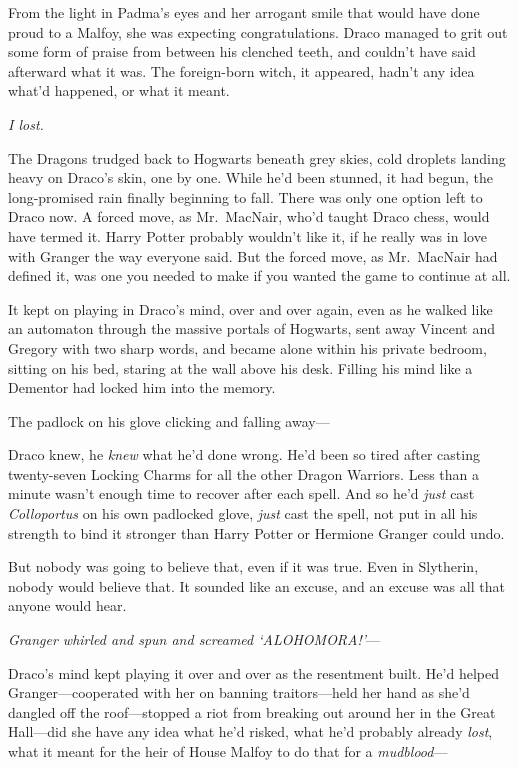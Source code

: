 From the light in Padma's eyes and her arrogant smile that would have done
proud to a Malfoy, she was expecting congratulations. Draco managed to grit out
some form of praise from between his clenched teeth, and couldn't have said
afterward what it was. The foreign-born witch, it appeared, hadn't any idea
what'd happened, or what it meant.

\emph{I lost.}

The Dragons trudged back to Hogwarts beneath grey skies, cold droplets landing
heavy on Draco's skin, one by one. While he'd been stunned, it had begun, the
long-promised rain finally beginning to fall. There was only one option left to
Draco now. A forced move, as Mr.~MacNair, who'd taught Draco chess, would have
termed it. Harry Potter probably wouldn't like it, if he really was in love
with Granger the way everyone said. But the forced move, as Mr.~MacNair had
defined it, was one you needed to make if you wanted the game to continue at
all.

It kept on playing in Draco's mind, over and over again, even as he walked like
an automaton through the massive portals of Hogwarts, sent away Vincent and
Gregory with two sharp words, and became alone within his private bedroom,
sitting on his bed, staring at the wall above his desk. Filling his mind like a
Dementor had locked him into the memory.

The padlock on his glove clicking and falling away---

Draco knew, he \emph{knew} what he'd done wrong. He'd been so tired after
casting twenty-seven Locking Charms for all the other Dragon Warriors. Less
than a minute wasn't enough time to recover after each spell. And so he'd
\emph{just} cast \emph{Colloportus} on his own padlocked glove, \emph{just}
cast the spell, not put in all his strength to bind it stronger than Harry
Potter or Hermione Granger could undo.

But nobody was going to believe that, even if it was true. Even in Slytherin,
nobody would believe that. It sounded like an excuse, and an excuse was all
that anyone would hear.

\emph{Granger whirled and spun and screamed `ALOHOMORA!'}---

Draco's mind kept playing it over and over as the resentment built. He'd helped
Granger---cooperated with her on banning traitors---held her hand as she'd
dangled off the roof---stopped a riot from breaking out around her in the Great
Hall---did she have any idea what he'd risked, what he'd probably already
\emph{lost}, what it meant for the heir of House Malfoy to do that for a
\emph{mudblood}---

